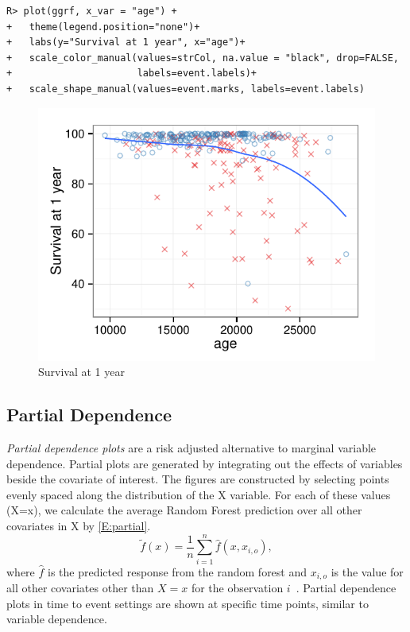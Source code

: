 \documentclass[nojss]{jss}\usepackage[]{graphicx}\usepackage[]{color}
\makeatletter
\def\maxwidth{ %
  \ifdim\Gin@nat@width>\linewidth
    \linewidth
  \else
    \Gin@nat@width
  \fi
}
\newenvironment{kframe}{%
 \def\at@end@of@kframe{}%
 \ifinner\ifhmode%
  \def\at@end@of@kframe{\end{minipage}}%
  \begin{minipage}{\columnwidth}%
 \fi\fi%
 \def\FrameCommand##1{\hskip\@totalleftmargin \hskip-\fboxsep
 \colorbox{shadecolor}{##1}\hskip-\fboxsep
     \hskip-\linewidth \hskip-\@totalleftmargin \hskip\columnwidth}%
 \MakeFramed {\advance\hsize-\width
   \@totalleftmargin\z@ \linewidth\hsize
   \@setminipage}}%
 {\par\unskip\endMakeFramed%
 \at@end@of@kframe}
\newenvironment{knitrout}{}{} %
\makeatother
\begin{document}
\begin{knitrout}\footnotesize
{}\color{fgcolor}\begin{kframe}
\begin{verbatim}
R> plot(ggrf, x_var = "age") +
+   theme(legend.position="none")+
+   labs(y="Survival at 1 year", x="age")+
+   scale_color_manual(values=strCol, na.value = "black", drop=FALSE,
+                      labels=event.labels)+
+   scale_shape_manual(values=event.marks, labels=event.labels)
\end{verbatim}
\end{kframe}\begin{figure}[!htpb]

{\centering \includegraphics[width=\maxwidth]{figure/rfs-variable-plotAge-1} 

}

\caption[Survival at 1 year]{Survival at 1 year\label{fig:variable-plotAge}}
\end{figure}


\end{knitrout}
\subsection{Partial Dependence}\label{S:partialDependence}

\emph{Partial dependence plots} are a risk adjusted alternative to marginal variable dependence. Partial plots are generated by integrating out the effects of variables beside the covariate of interest. The figures are constructed by selecting points evenly spaced along the distribution of the X variable. For each of these values (X=x), we calculate the average Random Forest prediction over all other covariates in X by \eqref{E:partial}.
\begin{equation}
\tilde{f}(x) = \frac{1}{n} \sum_{i=1}^n \hat{f}(x, x_{i,o}),
\label{E:partial}
\end{equation}
where $\hat{f}$ is the predicted response from the random forest and $x_{i,o}$ is the value for all other covariates other than $X=x$ for the observation $i$~\citep{FriedmanGreedyfunction:2000}. Partial dependence plots in time to event settings are shown at specific time points, similar to variable dependence.
\end{document}
